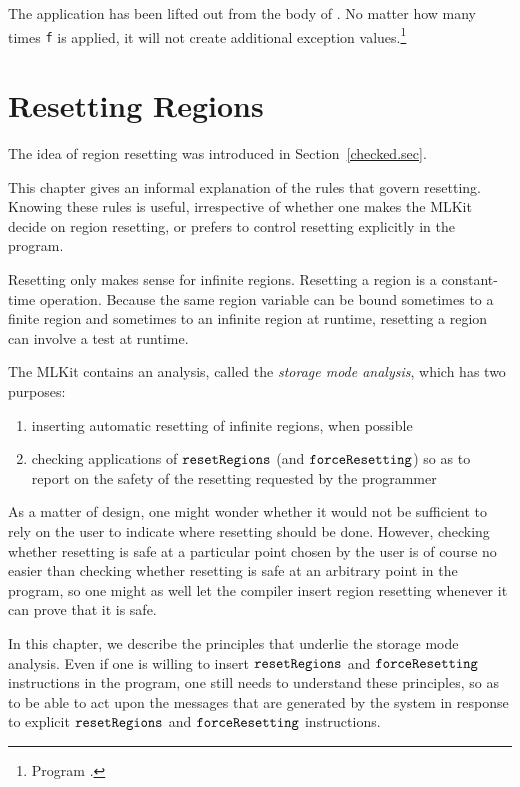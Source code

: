 \documentclass[12pt]{book}
\begin{document}
The application  has been lifted out from the body of
. No matter how many times {\tt f} is applied, it will not
create additional exception values.\footnote{Program
  .}

\chapter{Resetting Regions}
\label{storagemodes.sec}
The idea of region resetting was introduced in
Section~\ref{checked.sec}.
%

This chapter gives an informal explanation of the rules that govern
resetting. Knowing these rules is useful, irrespective of whether one
makes the MLKit decide on region resetting, or prefers to control
resetting explicitly in the program.

Resetting only makes sense for infinite regions.  Resetting a region
is a constant-time operation.  Because the same region variable can be
bound sometimes to a finite region and sometimes to an infinite region
at runtime, resetting a region can involve a test at runtime.

The MLKit contains an analysis, called the {\em storage mode analysis},
which has two purposes:
\begin{enumerate}
\item inserting automatic resetting of infinite regions, when possible
\item checking applications of $\hbox{\tt resetRegions}$ (and
  $\hbox{\tt forceResetting}$) so as to report on the safety of the resetting requested
  by the programmer
\end{enumerate}

As a matter of design, one might wonder whether it would not be
sufficient to rely on the user to indicate where resetting should be
done. However, checking whether resetting is safe at a particular
point chosen by the user is of course no easier than checking whether
resetting is safe at an arbitrary point in the program, so one might
as well let the compiler insert region resetting whenever it can prove
that it is safe.

In this chapter, we describe the principles that underlie the storage
mode analysis. Even if one is willing to insert $\hbox{\tt resetRegions}$ and
$\hbox{\tt forceResetting}$ instructions in the program, one still needs to understand
these principles, so as to be able to act upon the messages that are
generated by the system in response to explicit $\hbox{\tt resetRegions}$ and
$\hbox{\tt forceResetting}$ instructions.
\end{document}
